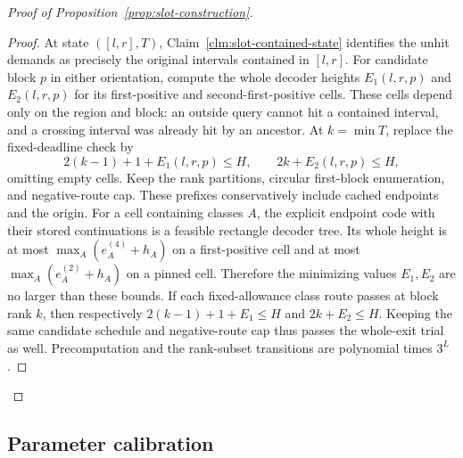 \begin{proof}[Proof of Proposition~\ref{prop:slot-construction}]
\begin{proof}
At state $([l,r],T)$, Claim~\ref{clm:slot-contained-state} identifies
the unhit demands as precisely the original intervals contained in
$[l,r]$. For candidate block $p$ in either
orientation, compute the whole decoder heights $E_1(l,r,p)$ and
$E_2(l,r,p)$ for its first-positive and second-first-positive cells.
These cells depend only on the region and block: an outside query
cannot hit a contained interval, and a crossing interval was already
hit by an ancestor. At $k=\min T$, replace the fixed-deadline check by
\[
 2(k-1)+1+E_1(l,r,p)\le H,\qquad 2k+E_2(l,r,p)\le H,
\]
omitting empty cells. Keep the rank partitions, circular first-block
enumeration, and negative-route cap. These prefixes conservatively
include cached endpoints and the origin. For a cell containing classes $A$, the explicit endpoint code with
their stored continuations is a feasible rectangle decoder tree. Its
whole height is at most $\max_A(e_A^{(4)}+h_A)$ on a first-positive
cell and at most $\max_A(e_A^{(2)}+h_A)$ on a pinned cell.
Therefore the minimizing values $E_1,E_2$ are no larger than these
bounds. If each fixed-allowance class route passes at block rank $k$,
then respectively
$2(k-1)+1+E_1\le H$ and $2k+E_2\le H$.
Keeping the same candidate schedule and negative-route cap thus
passes the whole-exit trial as well. Precomputation and the rank-subset
transitions are polynomial times $3^L$.
\end{proof}
\end{proof}

\subsection{Parameter calibration}
\label{sec:worst-calibration}

